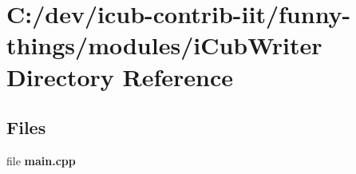 \section{C\+:/dev/icub-\/contrib-\/iit/funny-\/things/modules/i\+Cub\+Writer Directory Reference}
\label{dir_2eaa63838c4470da3bc214ebca123b03}
\subsection*{Files}
\begin{DoxyCompactItemize}
\item 
file {\bfseries main.\+cpp}
\end{DoxyCompactItemize}
